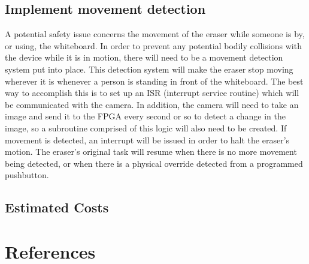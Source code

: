 \documentclass{IEEEtran}					%
\begin{document}
	\subsection{Implement movement detection}
	A potential safety issue concerns the movement of the eraser while someone is by, or using, the whiteboard. In order to prevent any potential bodily collisions with the device while it is in motion, there will need to be a movement detection system put into place. This detection system will make the eraser stop moving wherever it is whenever a person is standing in front of the whiteboard. The best way to accomplish this is to set up an ISR (interrupt service routine) which will be communicated with the camera. In addition, the camera will need to take an image and send it to the FPGA every second or so to detect a change in the image, so a subroutine comprised of this logic will also need to be created. If movement is detected, an interrupt will be issued in order to halt the eraser{\rq}s motion. The eraser{\rq}s original task will resume when there is no more movement being detected, or when there is a physical override detected from a programmed pushbutton.
	
	\subsection{Estimated Costs}
	\begin{table} [h!]	
		\centering
		\caption{Estimated costs of components for project}
		\label{table:1}
	\end{table}						
	\section*{References}
	
\end{document}
